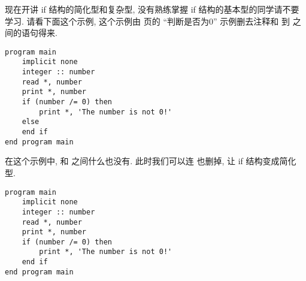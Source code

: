 现在开讲 if 结构的简化型和复杂型, 没有熟练掌握 if 结构的基本型的同学请不要学习. 请看下面这个示例, 这个示例由 \pageref{whether_zero} 页的 ``判断是否为0'' 示例删去注释和  到  之间的语句得来.
\begin{lstlisting}
program main
    implicit none
    integer :: number
    read *, number
    print *, number
    if (number /= 0) then
        print *, 'The number is not 0!'
    else
    end if
end program main
\end{lstlisting}
在这个示例中,  和  之间什么也没有. 此时我们可以连  也删掉, 让 if 结构变成简化型.
\begin{lstlisting}
program main
    implicit none
    integer :: number
    read *, number
    print *, number
    if (number /= 0) then
        print *, 'The number is not 0!'
    end if
end program main
\end{lstlisting}


